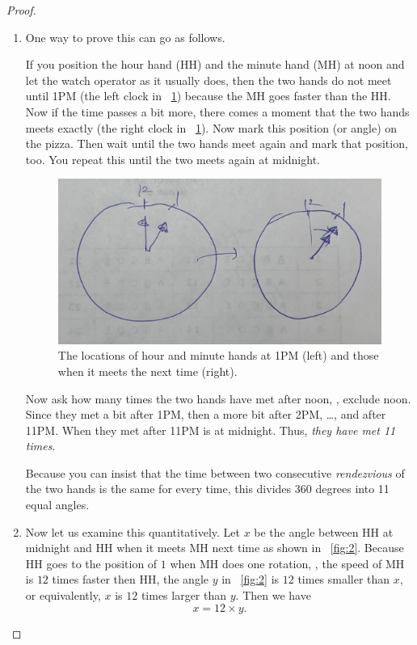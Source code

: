 \documentclass{article}
\begin{document}
\begin{proof}
\begin{enumerate}
\item
One way to prove this can go as follows.

If you position the hour hand (HH) and the minute hand (MH) at noon
and let the watch operator as it usually does,
then the two hands do not meet until 1PM (the left clock in \figurename~\ref{fig:1})
because the MH goes faster than the HH.
Now if the time passes a bit more,
there comes a moment that the two hands meets exactly (the right clock in \figurename~\ref{fig:1}).
Now mark this position (or angle) on the pizza.
Then wait until the two hands meet again and mark that position, too.
You repeat this until the two meets again at midnight.

\begin{figure}
\begin{center}
\includegraphics[width=.7\linewidth]{figures/pizza_HH_MH}
\end{center}
\caption{The locations of hour and minute hands at 1PM (left) and those when it meets the next time (right).}
\label{fig:1}
\end{figure}

Now ask how many times the two hands have met after noon, \ie,
exclude noon.
Since they met a bit after 1PM, then a more bit after 2PM, \ldots,
and after 11PM. When they met after 11PM is at midnight.
Thus, \emph{they have met 11 times}.

Because you can insist that the time between two consecutive \emph{rendezvious} of the two hands is the same for every time,
this divides $360$ degrees into 11 equal angles.


\item
Now let us examine this quantitatively.
Let $x$ be the angle between HH at midnight and HH when it meets MH next time as shown in \figurename~\ref{fig:2}.
Because HH goes to the position of $1$
when MH does one rotation,
\ie, the speed of MH is $12$ times faster then HH,
the angle $y$ in \figurename~\ref{fig:2} is $12$ times smaller than $x$,
or equivalently, $x$ is $12$ times larger than $y$.
Then we have
\begin{equation}
\label{eq:1}
x = 12 \times y.
\end{equation}


\end{enumerate}
\end{proof}
\end{document}
